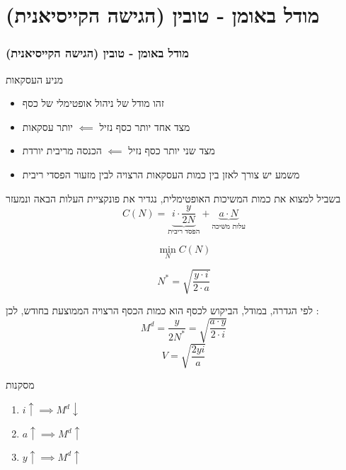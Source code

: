 \documentclass[usenames,dvipsnames,10pt]{beamer}
\begin{document}
\begin{RTL}
\begin{frame}[allowframebreaks]
\end{frame}

\section{מודל באומן - טובין (הגישה הקייסיאנית)}
\begin{frame}[allowframebreaks]
    \frametitle{מודל באומן - טובין (הגישה הקייסיאנית)}
    \begin{block}{מניע העסקאות}
        \begin{itemize}
            \item זהו מודל של ניהול אופטימלי של כסף
            \item מצד אחד יותר כסף נזיל $\impliedby$ יותר עסקאות
            \item מצד שני יותר כסף נזיל $\impliedby$ הכנסה מריבית יורדת
            \item משמע יש צורך לאזן בין כמות העסקאות הרצויה לבין מזעור הפסדי ריבית
        \end{itemize}
        בשביל למצוא את כמות המשיכות האופטימלית, נגדיר את פונקציית העלות הבאה ונמעזר 
        \[C(N) = \underbrace{i \cdot \frac{y}{2N}}_{\text{הפסד ריבית}} + \underbrace{a \cdot N}_{\text{עלות משיכה}}\]

        $$\min_{N} C(N)$$

        $$N^\ast = \sqrt{\frac{y \cdot i}{2 \cdot a}}$$
    \end{block}
    לפי הגדרה, במודל, הביקוש לכסף הוא כמות הכסף הרצויה הממוצעת בחודש, לכן : 
    $$M^d = \frac{y}{2N^\ast} = \sqrt{\frac{a \cdot y}{2 \cdot i}} $$
    $$V = \sqrt{\frac{2yi}{a}}$$
    \begin{exampleblock}{מסקנות}
        \begin{enumerate}
            \item $i \uparrow \implies M^d \downarrow$
            \item $a \uparrow \implies M^d \uparrow$
            \item $y \uparrow \implies M^d  \uparrow$
        \end{enumerate}

        
    \end{exampleblock}

    

\end{frame}


\end{RTL}
\end{document}
